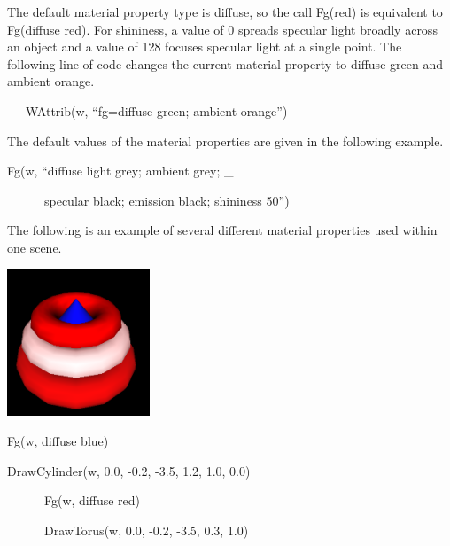 \documentclass[letterpaper]{article}
\begin{document}
{\bigskip

The default material property type is diffuse, so the call
\textsf{Fg({\textquotedbl}red{\textquotedbl})} is equivalent to
\textsf{Fg({\textquotedbl}diffuse red{\textquotedbl})}. For shininess,
a value of 0 spreads specular light broadly across an object and a
value of 128 focuses specular light at a single point. The following
line of code changes the current material property to diffuse green
and ambient orange.


\bigskip

{\ttfamily
\ \ \ \textsf{WAttrib(w, ``fg=diffuse green; ambient orange'')}}


\bigskip

{
The default values of the material properties are given in the following example. }


\bigskip

{\sffamily
Fg(w, ``diffuse light grey; ambient grey; \_}

{\sffamily
\ \ \ \ \ \ specular black; emission black; shininess 50'')}


\bigskip

The following is an example of several different material
properties used within one scene.

{\centering  \includegraphics[width=1.6799in,height=1.7299in]{utr9/utr9-img024.png} \par}

\bigskip


\bigskip

{\sffamily
Fg(w, {\textquotedbl}diffuse blue{\textquotedbl})}

{\sffamily
DrawCylinder(w, 0.0, -0.2, -3.5, 1.2, 1.0, 0.0)}

{\sffamily
\ \ \ \ \ \ Fg(w, {\textquotedbl}diffuse red{\textquotedbl})}

{\sffamily
\ \ \ \ \ \ DrawTorus(w, 0.0, -0.2, -3.5, 0.3, 1.0)}

}
\end{document}
